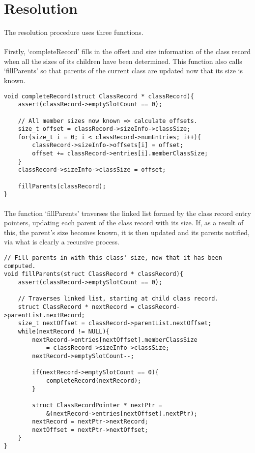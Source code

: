 \documentclass{article}
\begin{document}
\section{Resolution}

\paragraph{}
The resolution procedure uses three functions.

\paragraph{}
Firstly, `completeRecord' fills in the offset and size information of the class record when all the sizes of its children have been determined. This function also calls `fillParents' so that parents of the current class are updated now that its size is known.

\begin{lstlisting}
void completeRecord(struct ClassRecord * classRecord){
	assert(classRecord->emptySlotCount == 0);

	// All member sizes now known => calculate offsets.
	size_t offset = classRecord->sizeInfo->classSize;
	for(size_t i = 0; i < classRecord->numEntries; i++){
		classRecord->sizeInfo->offsets[i] = offset;
		offset += classRecord->entries[i].memberClassSize;
	}
	classRecord->sizeInfo->classSize = offset;
	
	fillParents(classRecord);
}
\end{lstlisting}

\paragraph{}
The function `fillParents' traverses the linked list formed by the class record entry pointers, updating each parent of the class record with its size. If, as a result of this, the parent's size becomes known, it is then updated and its parents notified, via what is clearly a recursive process.

\begin{lstlisting}
// Fill parents in with this class' size, now that it has been computed.
void fillParents(struct ClassRecord * classRecord){
	assert(classRecord->emptySlotCount == 0);

	// Traverses linked list, starting at child class record.
	struct ClassRecord * nextRecord = classRecord->parentList.nextRecord;
	size_t nextOffset = classRecord->parentList.nextOffset;
	while(nextRecord != NULL){
		nextRecord->entries[nextOffset].memberClassSize
			= classRecord->sizeInfo->classSize;
		nextRecord->emptySlotCount--;
		
		if(nextRecord->emptySlotCount == 0){
			completeRecord(nextRecord);
		}
		
		struct ClassRecordPointer * nextPtr =
			&(nextRecord->entries[nextOffset].nextPtr);
		nextRecord = nextPtr->nextRecord;
		nextOffset = nextPtr->nextOffset;
	}
}
\end{lstlisting}
\end{document}
